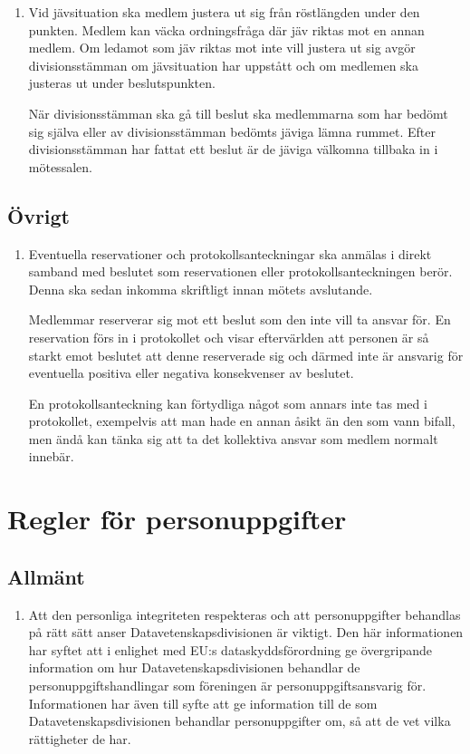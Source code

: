 \documentclass{dvd}
\begin{document}
	\begin{enumerate}[label=\arabic* §, ref=\arabic*]
		\item Vid jävsituation ska medlem justera ut sig från röstlängden under den punkten.
		Medlem kan väcka ordningsfråga där jäv riktas mot en annan medlem.
		Om ledamot som jäv riktas mot inte vill justera ut sig avgör divisionsstämman om jävsituation har uppstått och om medlemen ska justeras ut under beslutspunkten.

		När divisionsstämman ska gå till beslut ska medlemmarna som har bedömt sig själva eller av divisionsstämman bedömts jäviga lämna rummet.
		Efter divisionsstämman har fattat ett beslut är de jäviga välkomna tillbaka in i mötessalen.
	\end{enumerate}

	\subsection{Övrigt}

	\begin{enumerate}[label=\arabic* §, ref=\arabic*]
		\item Eventuella reservationer och protokollsanteckningar ska anmälas i direkt samband med beslutet som reservationen eller protokollsanteckningen berör.
		Denna ska sedan inkomma skriftligt innan mötets avslutande.

		Medlemmar reserverar sig mot ett beslut som den inte vill ta ansvar för.
		En reservation förs in i protokollet och visar eftervärlden att personen är så starkt emot beslutet att denne reserverade sig och därmed inte är ansvarig för eventuella positiva eller negativa konsekvenser av beslutet.

		En protokollsanteckning kan förtydliga något som annars inte tas med i protokollet, exempelvis att man hade en annan åsikt än den som vann bifall, men ändå kan tänka sig att ta det kollektiva ansvar som medlem normalt innebär.
	\end{enumerate}

\section{Regler för personuppgifter}

    \subsection{Allmänt}

    \begin{enumerate}[label=\arabic* \S, ref=\arabic*]
        \item Att den personliga integriteten respekteras och att personuppgifter behandlas på rätt sätt anser Datavetenskapsdivisionen är viktigt.
		Den här informationen har syftet att i enlighet med EU:s dataskyddsförordning ge övergripande information om hur Datavetenskapsdivisionen behandlar de personuppgiftshandlingar som föreningen är personuppgiftsansvarig för.
		Informationen har även till syfte att ge information till de som Datavetenskapsdivisionen behandlar personuppgifter om, så att de vet vilka rättigheter de har.
    \end{enumerate}
\end{document}
